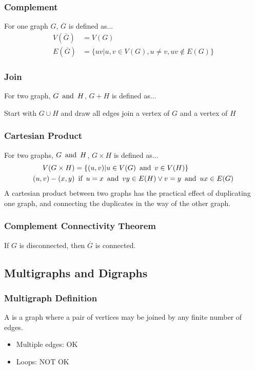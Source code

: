 \subsubsection*{Complement}
For one graph $G$, $\overline{G}$ is defined as...
\begin{align*}
    V(\overline{G}) & = V(G) \\
    E(\overline{G}) & = \{uv | u,v \in V(G), u \neq v, uv \notin E(G)\}
\end{align*}

\subsubsection*{Join}
For two graph, $G \operatorname{~\text{and}~} H$, $G + H$ is defined as...
\begin{center}
    Start with $G \cup H$ and draw all edges join a vertex of $G$ and a vertex of $H$
\end{center}

\subsubsection*{Cartesian Product}
For two graphs, $G \operatorname{~\text{and}~} H$, $G \times H$ is defined as...
\begin{align*}
    V(G \times H) & = \{(u,v) | u \in V(G) \operatorname{~\text{and}~} v \in V(H)\} \\
    (u,v)-(x,y) & \operatorname{~\text{if}~} u = x \operatorname{~\text{and}~} vy \in E(H) \lor v = y \operatorname{~\text{and}~} ux \in E(G)
\end{align*}
A cartesian product between two graphs has the practical effect of duplicating one graph, and connecting the duplicates in the way of the other graph.

\subsubsection*{Complement Connectivity Theorem}
If $G$ is disconnected, then $\overline{G}$ is connected.

\subsection{Multigraphs and Digraphs}

\subsubsection*{Multigraph Definition}
A  is a graph where a pair of vertices may be joined by any finite number of edges.
\begin{itemize}
    \item Multiple edges: OK
    \item Loops: NOT OK
\end{itemize}


